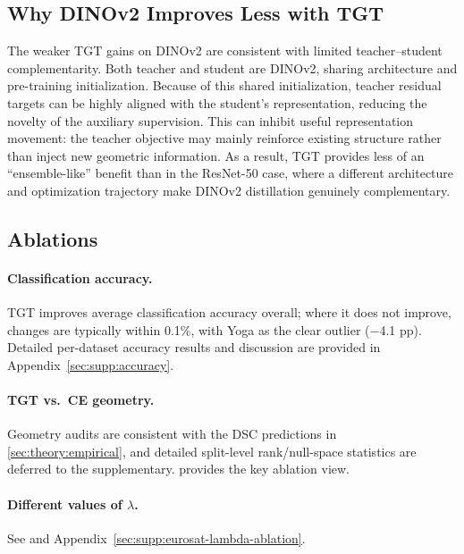 \documentclass[runningheads]{llncs}
\begin{document}
\subsection{Why DINOv2 Improves Less with TGT}
\label{sec:exp:dino-limit}

The weaker TGT gains on DINOv2 are consistent with limited teacher--student complementarity.
Both teacher and student are DINOv2, sharing architecture and pre-training initialization.
Because of this shared initialization, teacher residual targets can be highly aligned with the student's representation, reducing the novelty of the auxiliary supervision.
This can inhibit useful representation movement: the teacher objective may mainly reinforce existing structure rather than inject new geometric information.
As a result, TGT provides less of an ``ensemble-like'' benefit than in the ResNet-50 case, where a different architecture and optimization trajectory make DINOv2 distillation genuinely complementary.

\subsection{Ablations}
\label{sec:exp:ablations}

\paragraph{Classification accuracy.}
TGT improves average classification accuracy overall; where it does not improve, changes are typically within 0.1\%, with Yoga as the clear outlier ($-$4.1 pp).
Detailed per-dataset accuracy results and discussion are provided in Appendix~\ref{sec:supp:accuracy}.

\paragraph{TGT vs.\ CE geometry.}
Geometry audits are consistent with the DSC predictions in \cref{sec:theory:empirical}, and detailed split-level rank/null-space statistics are deferred to the supplementary.
 provides the key ablation view.

\paragraph{Different values of $\lambda$.}
See  and Appendix~\ref{sec:supp:eurosat-lambda-ablation}.
\end{document}
